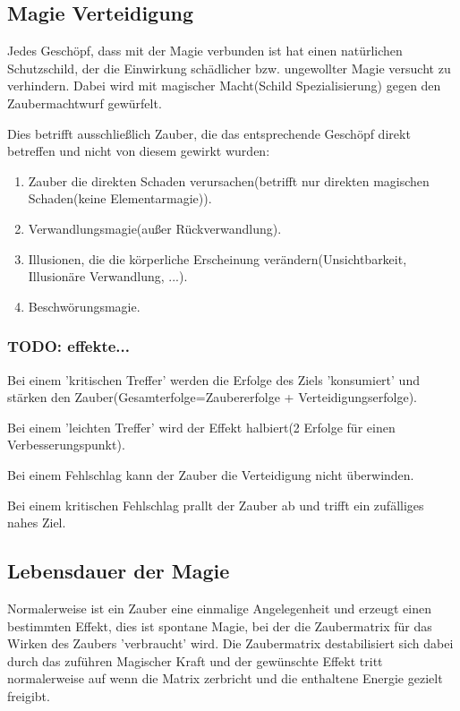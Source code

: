 \subsection{Magie Verteidigung}

Jedes Geschöpf, dass mit der Magie verbunden ist hat einen natürlichen Schutzschild, der die Einwirkung schädlicher bzw. ungewollter Magie versucht zu verhindern. Dabei wird mit magischer Macht(Schild Spezialisierung) gegen den Zaubermachtwurf gewürfelt.

Dies betrifft ausschließlich Zauber, die das entsprechende Geschöpf direkt betreffen und nicht von diesem gewirkt wurden:
\begin{enumerate}
\item Zauber die direkten Schaden verursachen(betrifft nur direkten magischen Schaden(keine Elementarmagie)).
\item Verwandlungsmagie(außer Rückverwandlung).
\item Illusionen, die die körperliche Erscheinung verändern(Unsichtbarkeit, Illusionäre Verwandlung, ...).
\item Beschwörungsmagie.
\end{enumerate}

\subsubsection{TODO: effekte...}

Bei einem 'kritischen Treffer' werden die Erfolge des Ziels 'konsumiert' und stärken den Zauber(Gesamterfolge=Zaubererfolge + Verteidigungserfolge).

Bei einem 'leichten Treffer' wird der Effekt halbiert(2 Erfolge für einen Verbesserungspunkt).

Bei einem Fehlschlag kann der Zauber die Verteidigung nicht überwinden. 

Bei einem kritischen Fehlschlag prallt der Zauber ab und trifft ein zufälliges nahes Ziel.

\subsection{Lebensdauer der Magie}
Normalerweise ist ein Zauber eine einmalige Angelegenheit und erzeugt einen bestimmten Effekt, dies ist spontane Magie, bei der die Zaubermatrix für das Wirken des Zaubers 'verbraucht' wird. Die Zaubermatrix destabilisiert sich dabei durch das zuführen Magischer Kraft und der gewünschte Effekt tritt normalerweise auf wenn die Matrix zerbricht und die enthaltene Energie gezielt freigibt.

